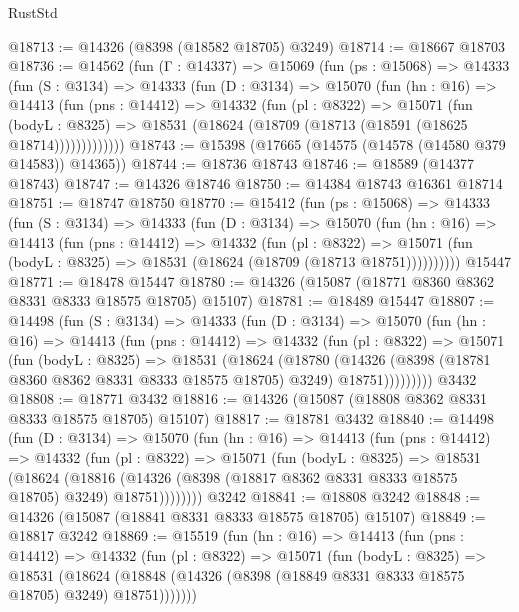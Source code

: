 \begin{lexlean}{RustStd}
\begin{coremodule}
@18713 := @14326 (@8398 (@18582 @18705) @3249)
@18714 := @18667 @18703
@18736 := @14562
    (fun (Γ : @14337) =>
    @15069
      (fun (ps : @15068) =>
      @14333
        (fun (S : @3134) =>
        @14333
          (fun (D : @3134) =>
          @15070
            (fun (hn : @16) =>
            @14413
              (fun (pns : @14412) =>
              @14332
                (fun (pl : @8322) =>
                @15071
                  (fun (bodyL : @8325) =>
                  @18531 (@18624 (@18709 (@18713 (@18591 (@18625 @18714)))))))))))))
@18743 := @15398 (@17665 (@14575 (@14578 (@14580 @379 @14583)) @14365))
@18744 := @18736 @18743
@18746 := @18589 (@14377 @18743)
@18747 := @14326 @18746
@18750 := @14384 @18743 @16361 @18714
@18751 := @18747 @18750
@18770 := @15412
    (fun (ps : @15068) =>
    @14333
      (fun (S : @3134) =>
      @14333
        (fun (D : @3134) =>
        @15070
          (fun (hn : @16) =>
          @14413
            (fun (pns : @14412) =>
            @14332
              (fun (pl : @8322) =>
              @15071 (fun (bodyL : @8325) => @18531 (@18624 (@18709 (@18713 @18751))))))))))
    @15447
@18771 := @18478 @15447
@18780 := @14326 (@15087 (@18771 @8360 @8362 @8331 @8333 @18575 @18705) @15107)
@18781 := @18489 @15447
@18807 := @14498
    (fun (S : @3134) =>
    @14333
      (fun (D : @3134) =>
      @15070
        (fun (hn : @16) =>
        @14413
          (fun (pns : @14412) =>
          @14332
            (fun (pl : @8322) =>
            @15071
              (fun (bodyL : @8325) =>
              @18531
                (@18624
                  (@18780
                    (@14326
                      (@8398 (@18781 @8360 @8362 @8331 @8333 @18575 @18705) @3249)
                      @18751)))))))))
    @3432
@18808 := @18771 @3432
@18816 := @14326 (@15087 (@18808 @8362 @8331 @8333 @18575 @18705) @15107)
@18817 := @18781 @3432
@18840 := @14498
    (fun (D : @3134) =>
    @15070
      (fun (hn : @16) =>
      @14413
        (fun (pns : @14412) =>
        @14332
          (fun (pl : @8322) =>
          @15071
            (fun (bodyL : @8325) =>
            @18531
              (@18624
                (@18816
                  (@14326 (@8398 (@18817 @8362 @8331 @8333 @18575 @18705) @3249) @18751))))))))
    @3242
@18841 := @18808 @3242
@18848 := @14326 (@15087 (@18841 @8331 @8333 @18575 @18705) @15107)
@18849 := @18817 @3242
@18869 := @15519
    (fun (hn : @16) =>
    @14413
      (fun (pns : @14412) =>
      @14332
        (fun (pl : @8322) =>
        @15071
          (fun (bodyL : @8325) =>
          @18531
            (@18624 (@18848 (@14326 (@8398 (@18849 @8331 @8333 @18575 @18705) @3249) @18751)))))))

\end{coremodule}
\end{lexlean}
